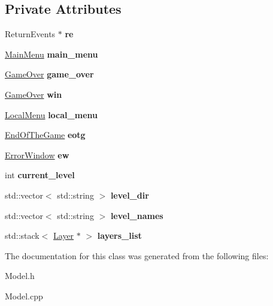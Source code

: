 \subsection*{Private Attributes}
\begin{DoxyCompactItemize}
\item 
\mbox{\label{class_model_afa6410e7691fa0d6bda372b0b798dd70}} 
Return\+Events $\ast$ {\bfseries re}
\item 
\mbox{\label{class_model_af749476e8bdcd74948ebe837bd3dbfc8}} 
\hyperlink{class_main_menu}{Main\+Menu} {\bfseries main\+\_\+menu}
\item 
\mbox{\label{class_model_a905afcc359caed9ea41d17dfc5cef784}} 
\hyperlink{class_game_over}{Game\+Over} {\bfseries game\+\_\+over}
\item 
\mbox{\label{class_model_a6e4433103b304e645fb85a6a9612b42e}} 
\hyperlink{class_game_over}{Game\+Over} {\bfseries win}
\item 
\mbox{\label{class_model_a53a6421a918ea8fab218d6eb7bc69119}} 
\hyperlink{class_local_menu}{Local\+Menu} {\bfseries local\+\_\+menu}
\item 
\mbox{\label{class_model_a44c5d8b7f91c4a3ea5fe5643a6fbf26e}} 
\hyperlink{class_end_of_the_game}{End\+Of\+The\+Game} {\bfseries eotg}
\item 
\mbox{\label{class_model_a7f547d436448e326441b8170c3ac7835}} 
\hyperlink{class_error_window}{Error\+Window} {\bfseries ew}
\item 
\mbox{\label{class_model_a72a4ba8da86e13263867c7e4e1cb9205}} 
int {\bfseries current\+\_\+level}
\item 
\mbox{\label{class_model_a357abb457c3e8bf987dce2418c6f09b2}} 
std\+::vector$<$ std\+::string $>$ {\bfseries level\+\_\+dir}
\item 
\mbox{\label{class_model_a1450c4773eee836985f551c288490bf4}} 
std\+::vector$<$ std\+::string $>$ {\bfseries level\+\_\+names}
\item 
\mbox{\label{class_model_ae25f86a150bc0b5c146ebd39567eea2f}} 
std\+::stack$<$ \hyperlink{class_layer}{Layer} $\ast$ $>$ {\bfseries layers\+\_\+list}
\end{DoxyCompactItemize}


The documentation for this class was generated from the following files\+:\begin{DoxyCompactItemize}
\item 
Model.\+h\item 
Model.\+cpp\end{DoxyCompactItemize}
